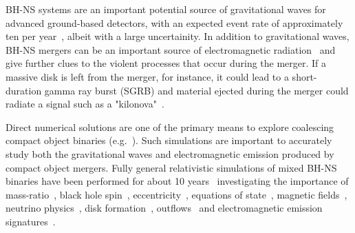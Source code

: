 BH-NS systems are an important potential source of gravitational waves
for advanced ground-based detectors, with an expected event rate of
approximately ten per year~\citep{AbadieLSC:2010}, albeit with a large
uncertainity. In addition to gravitational waves, BH-NS mergers can
be an important source of electromagnetic radiation~\citep{Li:1998bw,Roberts2011,metzger:11,2013MNRAS.430.2121P,2013MNRAS.430.2585R,2014ApJ...780...31T}
 and give further clues to
the violent processes that occur during the merger. If a massive disk
is left from the merger, for instance, it could lead to a
short-duration gamma ray burst (SGRB) and material ejected during the
merger could radiate a signal such as a "kilonova"~\citep{metzger:11}.

Direct numerical solutions are one of the primary means to explore
coalescing compact object binaries
(e.g.~\cite{baumgarteShapiroBook,2014ARA&A..52..661L,Pfeiffer:2012pc}).
Such simulations are important to accurately study both the
gravitational waves and electromagnetic emission produced by compact
object mergers. Fully general relativistic simulations of mixed BH-NS
binaries have been performed for about 10
years~\citep{Shibata:2006bs,Faber2005} investigating the importance of
mass-ratio~\citep{Foucart:2014nda,Foucart:2013psa,FoucartEtAl:2011},
black hole
spin~\citep{East:2011xa,Shibata:2006ks,Foucart:2013a,Foucart:2010eq,Kawaguchi:2015,Etienne:2008re},
eccentricity~\citep{East:2015yea,2012PhRvD..85l4009E,Stephens:2011as}, equations of state~\citep{Duez:2009yy,Kyutoku:2010zd,Kawaguchi:2015,Foucart:2013a},
magnetic
fields~\citep{Chawla:2010sw,Paschalidis2014,Kiuchi:2015qua,2012PhRvD..85f4029E,Etienne:2012te},
neutrino physics~\citep{Foucart:2015a}, disk
formation~\citep{Lovelace:2013vma,Shibata:2007zm,Pannarale:2015jia},
outflows~\citep{Deaton2013,Kyutoku:2013wxa} and electromagnetic
emission signatures~\citep{PaschalidisEtAl:2013,Kawaguchi:2016}.

